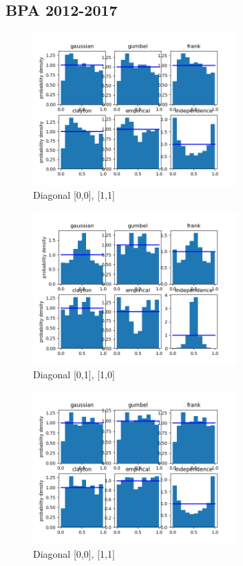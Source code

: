 \clearpage

\subsection{BPA 2012-2017}



\begin{figure}[h]
	\centering
	\includegraphics[width=0.7\textwidth]{BPA_2012_2017/2015-06-15_12_00-2015-06-15_13_00-0.png}
	\caption{Diagonal [0,0], [1,1]}
\end{figure}

\begin{figure}[h]
	\centering
	\includegraphics[width=0.7\textwidth]{BPA_2012_2017/2015-06-15_12_00-2015-06-15_13_00-1.png}
	\caption{Diagonal [0,1], [1,0]}
\end{figure}



\begin{figure}[h]
	\centering
	\includegraphics[width=0.7\textwidth]{BPA_2012_2017/2013-01-01_12_00-2013-01-01_13_00-0.png}
	\caption{Diagonal [0,0], [1,1]}
\end{figure}

